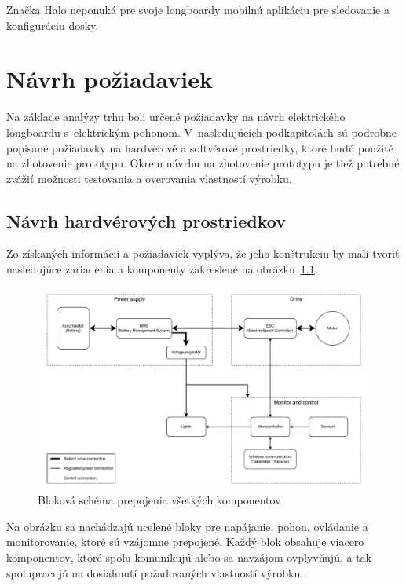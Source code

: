 Značka Halo neponuká pre svoje longboardy mobilnú aplikáciu pre sledovanie a konfiguráciu dosky.\cite{Halo}

\chapter{Návrh požiadaviek}\label{navrh}
Na základe analýzy trhu boli určené požiadavky na návrh elektrického longboardu s~elektrickým pohonom.
V~nasledujúcich podkapitolách sú podrobne popísané požiadavky na hardvérové a softvérové prostriedky, ktoré budú použité na zhotovenie prototypu.
Okrem návrhu na zhotovenie prototypu je tiež potrebné zvážiť možnosti testovania a overovania vlastností výrobku.


\section{Návrh hardvérových prostriedkov}
Zo získaných informácií a požiadaviek vyplýva, že jeho konštrukciu by mali tvoriť nasledujúce zariadenia a komponenty zakreslené na obrázku~\ref{fig:blokova_schema}.

\begin{figure}[h]
    \centering
    \includegraphics[width=1\textwidth]{obrazky-figures/block-diagram.pdf}
    \caption{Bloková schéma prepojenia všetkých komponentov}\label{fig:blokova_schema}
\end{figure}

Na obrázku sa nachádzajú ucelené bloky pre napájanie, pohon, ovládanie a monitorovanie, ktoré sú vzájomne prepojené.
Každý blok obsahuje viacero komponentov, ktoré spolu komunikujú alebo sa navzájom ovplyvňujú, a tak spolupracujú na dosiahnutí požadovaných vlastností výrobku.

